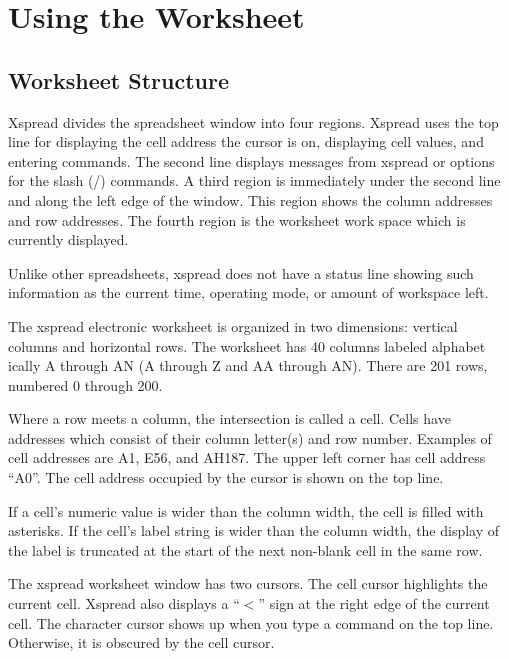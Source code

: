 \section*{Using the Worksheet}

\subsection*{Worksheet Structure}

    Xspread divides the spreadsheet window into four regions.  Xspread uses 
the top line for displaying the cell address the cursor is on, displaying cell 
values, and entering commands.  The second line displays messages from xspread 
or options for the slash (/) commands.  A third region is immediately under 
the second line and along the left edge of the window.  This region shows the 
column addresses and row addresses.  The fourth region is the worksheet work 
space which is currently displayed.

    Unlike other spreadsheets, xspread does not have a status line showing 
such information as the current time, operating mode, or amount of workspace 
left.

    The xspread electronic worksheet is organized in two dimensions:  vertical 
columns and horizontal rows.  The worksheet has 40 columns labeled alphabet
ically A through AN (A through Z and AA through AN).  There are 201 rows, 
numbered 0 through 200.

    Where a row meets a column, the intersection is called a cell.  Cells have 
addresses which consist of their column letter(s) and row number.  Examples of 
cell addresses are A1, E56, and AH187.  The upper left corner has cell address 
``A0''.  The cell address occupied by the cursor is shown on the top line.

    If a cell's numeric value is wider than the column width, the cell is 
filled with asterisks.  If the cell's label string is wider than the column 
width, the display of the label is truncated at the start of the next 
non-blank cell in the same row.

    The xspread worksheet window has two cursors.  The cell cursor highlights 
the current cell.  Xspread also displays a ``$<$'' sign at the right edge of the
current cell.  The character cursor shows up when you type a command on the 
top line.  Otherwise, it is obscured by the cell cursor.

